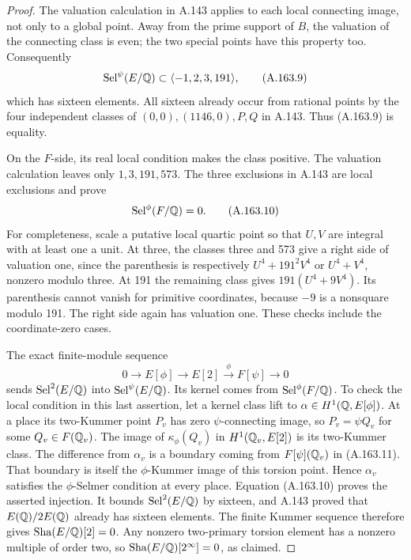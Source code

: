 \begin{proof}
The valuation calculation in A.143 applies to
each local connecting image, not only to a global
point.  Away from the prime support of \(B\),
the valuation of the connecting class is even;
the two special points have this property too.
Consequently
\[
 \operatorname{Sel}^{\psi}(E/\mathbb Q)
                  \subset\langle-1,2,3,191\rangle,
\tag{A.163.9}
\]
which has sixteen elements.  All sixteen already
occur from rational points by the four independent
classes of \((0,0),(1146,0),P,Q\) in A.143.
Thus (A.163.9) is equality.

On the \(F\)-side, its real local condition makes
the class positive.  The valuation calculation
leaves only \(1,3,191,573\).  The three exclusions
in A.143 are local exclusions and prove
\[
                         \operatorname{Sel}^{\phi}(F/\mathbb Q)=0.
\tag{A.163.10}
\]
For completeness, scale a putative local quartic
point so that \(U,V\) are integral with at least
one a unit.  At three, the classes three and 573
give a right side of valuation one, since the
parenthesis is respectively \(U^4+191^2V^4\) or
\(U^4+V^4\), nonzero modulo three.  At 191 the
remaining class gives \(191(U^4+9V^4)\).  Its
parenthesis cannot vanish for primitive coordinates,
because \(-9\) is a nonsquare modulo 191.
The right side again has valuation one.  These
checks include the coordinate-zero cases.

The exact finite-module sequence
\[
           0\longrightarrow E[\phi]\longrightarrow E[2]
                     \xrightarrow{\phi}F[\psi]\longrightarrow0
\tag{A.163.11}
\]
sends \(\operatorname{Sel}^2(E/\mathbb Q)\) into
\(\operatorname{Sel}^{\psi}(E/\mathbb Q)\).
Its kernel comes from
\(\operatorname{Sel}^{\phi}(F/\mathbb Q)\).  To check
the local condition in this last assertion, let
a kernel class lift to \(\alpha\in H^1(\mathbb Q,E[\phi])\).
At a place its two-Kummer point \(P_v\) has zero
\(\psi\)-connecting image, so \(P_v=\psi Q_v\)
for some \(Q_v\in F(\mathbb Q_v)\).  The image of
\(\kappa_\phi(Q_v)\) in \(H^1(\mathbb Q_v,E[2])\)
is its two-Kummer class.  The difference from
\(\alpha_v\) is a boundary coming from
\(F[\psi](\mathbb Q_v)\) in (A.163.11).  That boundary
is itself the \(\phi\)-Kummer image of this
torsion point.  Hence \(\alpha_v\) satisfies the
\(\phi\)-Selmer condition at every place.
Equation (A.163.10) proves the asserted injection.
It bounds \(\operatorname{Sel}^2(E/\mathbb Q)\) by
sixteen, and A.143 proved that \(E(\mathbb Q)/2E(\mathbb Q)\)
already has sixteen elements.  The finite Kummer
sequence therefore gives \(\operatorname{Sha}(E/\mathbb Q)[2]=0\).
Any nonzero two-primary torsion element has a
nonzero multiple of order two, so
\(\operatorname{Sha}(E/\mathbb Q)[2^\infty]=0\), as claimed.


\end{proof}
